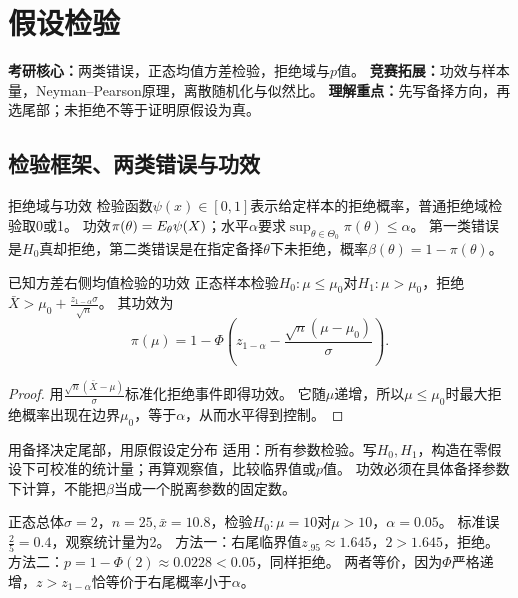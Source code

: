 \chapter{假设检验}\label{ch:08}
\begin{examtip}
\textbf{考研核心：}两类错误，正态均值方差检验，拒绝域与$p$值。
\textbf{竞赛拓展：}功效与样本量，Neyman--Pearson原理，离散随机化与似然比。
\textbf{理解重点：}先写备择方向，再选尾部；未拒绝不等于证明原假设为真。
\end{examtip}
\section{检验框架、两类错误与功效}\label{sec:81}
\begin{definition}{拒绝域与功效}
检验函数$\psi(x)\in[0,1]$表示给定样本的拒绝概率，普通拒绝域检验取0或1。
功效$\pi(\theta)=E_\theta\psi(X)$；水平$\alpha$要求$\sup_{\theta\in\Theta_0}\pi(\theta)\le\alpha$。
第一类错误是$H_0$真却拒绝，第二类错误是在指定备择$\theta$下未拒绝，概率$\beta(\theta)=1-\pi(\theta)$。
\end{definition}
\begin{theorem}{已知方差右侧均值检验的功效}
正态样本检验$H_0:\mu\le\mu_0$对$H_1:\mu>\mu_0$，拒绝$\bar X>\mu_0+\frac{z_{1-\alpha}\sigma}{\sqrt n}$。
其功效为
\[\pi(\mu)=1-\Phi\!\left(z_{1-\alpha}-\dfrac{\sqrt n(\mu-\mu_0)}\sigma\right).\]
\end{theorem}
\begin{proof}
用$\frac{\sqrt n(\bar X-\mu)}{\sigma}$标准化拒绝事件即得功效。
它随$\mu$递增，所以$\mu\le\mu_0$时最大拒绝概率出现在边界$\mu_0$，等于$\alpha$，从而水平得到控制。
\end{proof}
\begin{method}{用备择决定尾部，用原假设定分布}
适用：所有参数检验。写$H_0,H_1$，构造在零假设下可校准的统计量；再算观察值，比较临界值或$p$值。
功效必须在具体备择参数下计算，不能把$\beta$当成一个脱离参数的固定数。
\end{method}
{正态总体$\sigma=2$，$n=25,\bar x=10.8$，检验$H_0:\mu=10$对$\mu>10$，$\alpha=0.05$。}
{标准误$\frac{2}{5}=0.4$，观察统计量为2。}
{方法一：右尾临界值$z_{.95}\approx1.645$，$2>1.645$，拒绝。
方法二：$p=1-\Phi(2)\approx0.0228<0.05$，同样拒绝。
两者等价，因为$\Phi$严格递增，$z>z_{1-\alpha}$恰等价于右尾概率小于$\alpha$。}
